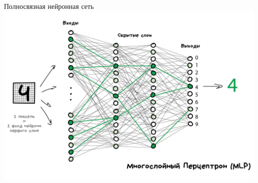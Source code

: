 \documentclass[aspectratio=169]{beamer}
\begin{document}
\begin{frame}{Полносвязная нейронная сеть}
    \centering
    \includegraphics[width=.71\linewidth]{graphs/fig17.jpg}
\end{frame}
\end{document}
